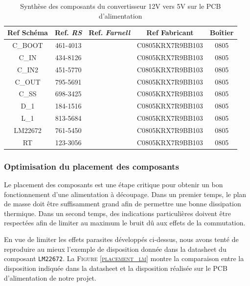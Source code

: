 				\begin{table}
					\begin{center}
						\begin{tabular}{|c|c|c|c|c|}
						\hline
						\textbf{Ref Schéma} & Ref. \textit{RS} & Ref. \textit{Farnell} & Ref Fabricant & Boîtier \\ 
						\hline
						C\_BOOT & 461-4013 & & C0805KRX7R9BB103 & 0805 \\
						\hline
						C\_IN & 434-8126 & & C0805KRX7R9BB103 & 0805 \\
						\hline
						C\_IN2 & 451-5770 & & C0805KRX7R9BB103 & 0805 \\
						\hline
						C\_OUT & 795-5691 & & C0805KRX7R9BB103 & 0805 \\
						\hline
						C\_SS & 698-3425 & & C0805KRX7R9BB103 & 0805 \\
						\hline
						D\_1 & 184-1516 & & C0805KRX7R9BB103 & 0805 \\
						\hline
						L\_1 & 813-5684 & & C0805KRX7R9BB103 & 0805 \\
						\hline
						LM22672 & 761-5450 & & C0805KRX7R9BB103 & 0805 \\
						\hline
						RT & 123-3056 & & C0805KRX7R9BB103 & 0805 \\
						\hline
						\end{tabular}
					\end{center}
					\caption{Synthèse des composants du convertisseur 12V vers 5V sur le PCB d'alimentation}
					\label{synth_composants}
				\end{table}
				
				\subsubsection{Optimisation du placement des composants}
				
				Le placement des composants est une étape critique pour
				obtenir un bon fonctionnement d'une alimentation à
				découpage. Dans un premier temps, le plan de masse 
				doit être suffisamment grand afin de permettre une bonne
				dissipation thermique. Dans un second temps, des indications
				particulières doivent être respectées afin de limiter
				au maximum le bruit dû aux effets de la commutation. 
				
				En vue de limiter les effets parasites développés ci-dessus,
				nous avons tenté de reproduire au mieux l'exemple de disposition
				donnée dans la datasheet du composant \texttt{LM22672}.
				La \textsc{Figure \ref{placement_lm}} montre la comparaison
				entre la disposition indiquée dans la datasheet et la disposition
				réalisée sur le PCB d'alimentation de notre projet.
				
